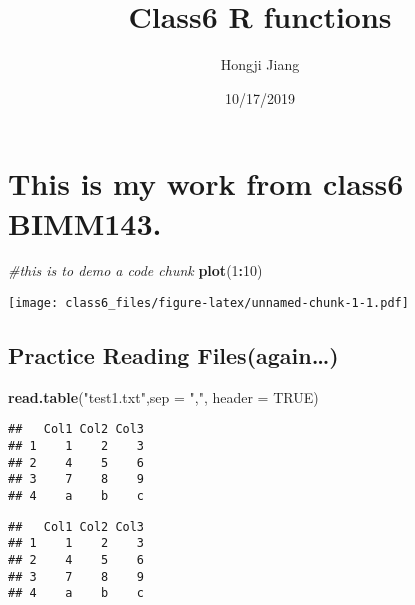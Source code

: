 \documentclass[]{article}
\title{Class6 R functions}
\author{Hongji Jiang}
\date{10/17/2019}
\newenvironment{Shaded}{\begin{snugshade}}{\end{snugshade}}
\newcommand{\KeywordTok}[1]{\textcolor[rgb]{0.13,0.29,0.53}{\textbf{#1}}}
\newcommand{\DataTypeTok}[1]{\textcolor[rgb]{0.13,0.29,0.53}{#1}}
\newcommand{\DecValTok}[1]{\textcolor[rgb]{0.00,0.00,0.81}{#1}}
\newcommand{\StringTok}[1]{\textcolor[rgb]{0.31,0.60,0.02}{#1}}
\newcommand{\CommentTok}[1]{\textcolor[rgb]{0.56,0.35,0.01}{\textit{#1}}}
\newcommand{\OtherTok}[1]{\textcolor[rgb]{0.56,0.35,0.01}{#1}}
\newcommand{\OperatorTok}[1]{\textcolor[rgb]{0.81,0.36,0.00}{\textbf{#1}}}
\newcommand{\NormalTok}[1]{#1}
\begin{document}
\maketitle

\section{\texorpdfstring{This is my work from class6
\textbf{BIMM143}.}{This is my work from class6 BIMM143.}}\label{this-is-my-work-from-class6-bimm143.}

\begin{Shaded}
\begin{Highlighting}[]
\CommentTok{#this is to demo a code chunk}
\KeywordTok{plot}\NormalTok{(}\DecValTok{1}\OperatorTok{:}\DecValTok{10}\NormalTok{)}
\end{Highlighting}
\end{Shaded}

\texttt{[image: class6\_files/figure-latex/unnamed-chunk-1-1.pdf]}

\subsection{Practice Reading
Files(again\ldots{})}\label{practice-reading-filesagain}

\begin{Shaded}
\begin{Highlighting}[]
\KeywordTok{read.table}\NormalTok{(}\StringTok{"test1.txt"}\NormalTok{,}\DataTypeTok{sep =} \StringTok{","}\NormalTok{, }\DataTypeTok{header =} \OtherTok{TRUE}\NormalTok{)}
\end{Highlighting}
\end{Shaded}

\begin{verbatim}
##   Col1 Col2 Col3
## 1    1    2    3
## 2    4    5    6
## 3    7    8    9
## 4    a    b    c
\end{verbatim}

\begin{Shaded}
\end{Shaded}

\begin{verbatim}
##   Col1 Col2 Col3
## 1    1    2    3
## 2    4    5    6
## 3    7    8    9
## 4    a    b    c
\end{verbatim}
\end{document}
